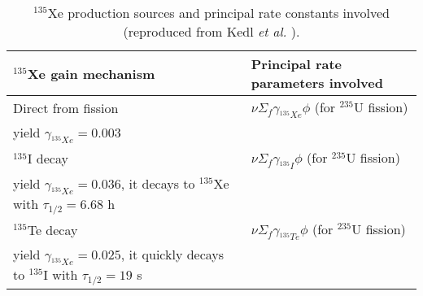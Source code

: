 \begin{table}[ht!]
	\caption{$^{135}$Xe production sources and principal rate constants 
		involved
		(reproduced from Kedl \emph{et al.} \cite{kedl_development_1967}).}
	\centering
	\begin{tabularx}{\textwidth}{b  b}
		\hline \textbf{$^{135}$Xe gain mechanism} & \textbf{Principal rate 
			parameters involved}  	\\ \hline 
		Direct from fission & $\nu \Sigma_f \gamma_{^{135}Xe}\phi$ (for 
		$^{235}$U fission) \\ 
		yield $\gamma_{^{135}Xe}=0.003$ & \\ \hline
		$^{135}$I decay       & $\nu \Sigma_f \gamma_{^{135}I}\phi$ (for 
		$^{235}$U fission) \\
		yield $\gamma_{^{135}Xe}=0.036$, it decays to $^{135}$Xe with 
		$\tau_{1/2}=6.68$ h & 			                    \\		\hline
		$^{135}$Te decay      & 
		$\nu \Sigma_f \gamma_{^{135}Te}\phi$ (for $^{235}$U fission) \\
		yield $\gamma_{^{135}Xe}=0.025$, 
		it quickly decays to $^{135}$I with $\tau_{1/2}=19$ s 
		& 			                    \\	\hline 
	\end{tabularx}
	\label{tab:xe_gain}
\end{table}

